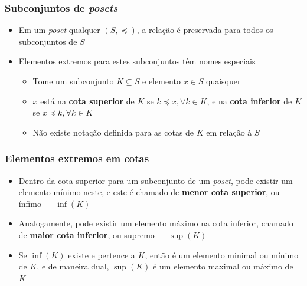 \documentclass[12pt]{beamer}
\begin{document}
\begin{frame}
  \frametitle{Subconjuntos de \emph{posets}}
  \begin{itemize}
    \item Em um \emph{poset} qualquer $(S, \preccurlyeq)$, a relação é
        preservada para todos os subconjuntos de $S$
    \item Elementos extremos para estes subconjuntos têm nomes especiais
    \begin{itemize}[itemsep=0pt]
      \item Tome um subconjunto $K \subseteq S$ e elemento $x \in S$ quaisquer
      \item $x$ está na \textbf{cota superior} de $K$ se $k \preccurlyeq x,
          \forall k \in K$, e na \textbf{cota inferior} de $K$ se $x
            \preccurlyeq k, \forall k \in K$
      \item Não existe notação definida para as cotas de $K$ em relação à $S$
    \end{itemize}
  \end{itemize}
\end{frame}

\begin{frame}
  \frametitle{Elementos extremos em cotas}
  \begin{itemize}
    \item Dentro da cota superior para um subconjunto de um \emph{poset},
        pode existir um elemento mínimo neste, e este é chamado de
          \textbf{menor cota superior}, ou ínfimo --- $\inf(K)$
    \item Analogamente, pode existir um elemento máximo na cota inferior,
        chamado de \textbf{maior cota inferior}, ou supremo --- $\sup(K)$
    \item Se $\inf(K)$ existe e pertence a $K$, então é um elemento
        minimal ou mínimo de $K$, e de maneira dual, $\sup(K)$ é um
          elemento maximal ou máximo de $K$
  \end{itemize}
\end{frame}
\end{document}

